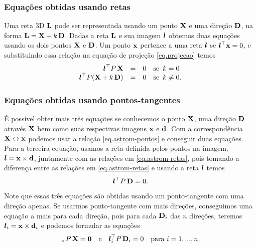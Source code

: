\subsubsection*{Equações obtidas usando retas} 

Uma reta 3D ${\bf L}$ pode ser representada usando um ponto $\mathbf{X}$ e uma direção ${\bf D}$, na forma ${\bf L}=\mathbf{X}+k\,{\bf D}$. Dadas a reta ${\bf L}$ e sua imagem $\boldsymbol{l}$ obtemos duas equações usando os dois pontos $\mathbf{X}$ e ${\bf D}$. Um ponto $\mathbf{x}$ pertence a uma reta $\boldsymbol{l}$ se $\boldsymbol{l}^\top\mathbf{x}=0$, e substituindo essa relação na equação de projeção \ref{eq.projecao} temos
\begin{equation}\label{eq.astrom-retas}
\begin{array}{rcll}
\boldsymbol{l}^\top P\,\mathbf{X}&=&0&\text{se}\,\,\,k=0\\
\boldsymbol{l}^\top P(\mathbf{X}+k\,{\bf D})&=&0&\text{se}\,\,\,k\neq0.
\end{array}
\end{equation}  

\subsubsection*{Equações obtidas usando pontos-tangentes}

É possível obter mais três equações se conhecemos o ponto $\mathbf{X}$, uma direção ${\bf D}$ através $\mathbf{X}$ bem como suas respectivas imagens $\mathbf{x}$ e ${\bf d}$. Com a correspondência $\mathbf{X}\leftrightarrow\mathbf{x}$ podemos usar a relação \ref{eq.astrom-pontos} e conseguir duas equações. Para a terceira equação, usamos a reta definida pelos pontos na imagem, $\boldsymbol{l}=\mathbf{x}\times{\bf d}$, juntamente com as relações em \ref{eq.astrom-retas}, pois tomando a diferença entre as relações em \ref{eq.astrom-retas} e usando a reta $\boldsymbol{l}$ temos
\begin{equation}\label{eq.astrom-direcao}
\boldsymbol{l}^\top P\,{\bf D}=0.
\end{equation}  

Note que essas três equações são obtidas usando um ponto-tangente com uma direção apenas. Se usarmos ponto-tangente com mais direções, conseguimos uma equação a mais para cada direção, pois para cada ${\bf D}_i$ das $n$ direções, teremos $\boldsymbol{l}_i=\mathbf{x}\times{\bf d}_i$ e podemos formular as equações
\begin{equation}
[\x]_\times P\,\X={\bf 0}\quad\text{e}\quad\lightrgb_i^\top P\,{\bf D}_i=0\quad\text{para}\,\,i=1,...,n.
\end{equation}

